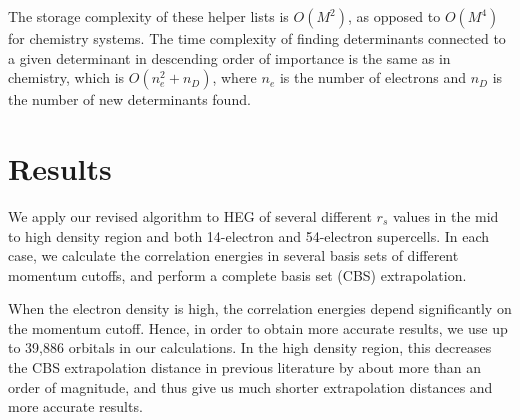 \documentclass[%
reprint,
 superscriptaddress,
 amsmath,amssymb,
 aps,
]{revtex4-1}
\begin{document}
The storage complexity of these helper lists is $O(M^2)$, as opposed to $O(M^4)$ for chemistry systems.
The time complexity of finding determinants connected to a given determinant in descending order of importance is the same as in chemistry, which is $O(n_e^2 + n_D)$, where $n_e$ is the number of electrons and $n_D$ is the number of new determinants found.

\section{Results}
\label{results}
We apply our revised algorithm to HEG of several different $r_s$ values in the mid to high density region and both 14-electron and 54-electron supercells.
In each case, we calculate the correlation energies in several basis sets of different momentum cutoffs, and perform a complete basis set (CBS) extrapolation.

When the electron density is high, the correlation energies depend significantly on the momentum cutoff.
Hence, in order to obtain more accurate results, we use up to 39,886 orbitals in our calculations.
In the high density region, this decreases the CBS extrapolation distance in previous literature by about more than an order of magnitude, and thus give us much shorter extrapolation distances and more accurate results.
\end{document}
